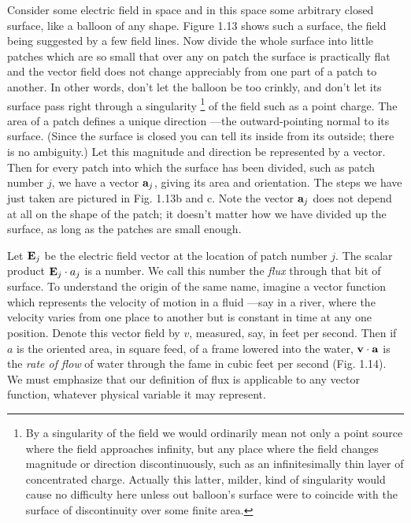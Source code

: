 Consider some electric field in space and in this space some
arbitrary closed surface, like a balloon of any shape. Figure 1.13
shows such a surface, the field being suggested by a few field lines.
Now divide the whole surface into little patches which are so small
that over any on patch the surface is practically flat and the vector
field does not change appreciably from one part of a patch to
another. In other words, don't let the balloon be too crinkly, and
don't let its surface pass right through a singularity \footnote{By a
singularity of the field we would ordinarily mean not only a point
source where the field approaches infinity, but any place where the
field changes magnitude or direction discontinuously, such as an
infinitesimally thin layer of concentrated charge.
Actually this latter, milder, kind of singularity would cause no
difficulty here unless out balloon's surface were to coincide with
the surface of discontinuity over some finite area.} of the field
such as a point charge. The area of a patch defines a unique
direction ---the outward-pointing normal to its surface. (Since the
surface is closed you can tell its inside from its outside; there is
no ambiguity.) Let this magnitude and direction be represented by a
vector. Then for every patch into which the surface has been divided,
such as patch number $j$, we have a vector $\mathbf{a}_j$, giving its area
and orientation. The steps we have just taken are pictured in Fig.
1.13b and c. Note the vector $\mathbf{a}_j$ does not depend at all on
the shape of the patch; it doesn't matter how we have divided up the
surface, as long as the patches are small enough.

Let $\mathbf{E}_j$ be the electric field vector at the location of patch
number $j$. The scalar product $\mathbf{E}_j \cdot a_j$ is a number.
We call this number the \emph{flux} through that bit of surface.
To understand the origin of the same name, imagine a vector function
which represents the velocity of motion in a fluid ---say in a river,
where the velocity varies from one place to another but is constant
in time at any one position. Denote this vector field by $v$,
measured, say, in feet per second. Then if $a$ is the oriented area,
in square feed, of a frame lowered into the water, $\mathbf{v} \cdot \mathbf{a}$
is the \emph{rate of flow} of water through the fame in cubic feet
per second (Fig. 1.14). We must emphasize that our definition of
flux is applicable to any vector function, whatever physical variable
it may represent.


